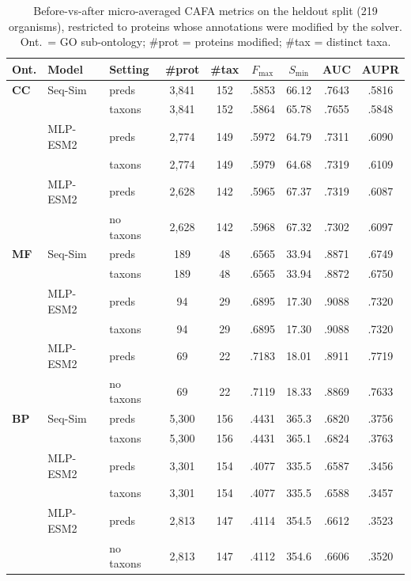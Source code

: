 \begin{table}[!h]
\centering
\caption{Before-vs-after micro-averaged CAFA metrics on the heldout split (219 organisms), restricted to proteins whose annotations were modified by the solver. Ont.\ = GO sub-ontology; \#prot = proteins modified; \#tax = distinct taxa.}
\label{tab:supp-modified}
\small
\setlength{\tabcolsep}{3pt}
\renewcommand{\arraystretch}{0.92}
\begin{tabular}{lll*{6}c}
\toprule
Ont. & Model & Setting & \#prot & \#tax & $F_{\max}$ & $S_{\min}$ & AUC & AUPR \\
\midrule
\textbf{CC} & Seq-Sim   & preds      & 3{,}841 & 152 & .5853 & 66.12 & .7643 & .5816 \\
            &           & taxons     & 3{,}841 & 152 & .5864 & 65.78 & .7655 & .5848 \\
            & MLP-ESM2  & preds      & 2{,}774 & 149 & .5972 & 64.79 & .7311 & .6090 \\
            &           & taxons     & 2{,}774 & 149 & .5979 & 64.68 & .7319 & .6109 \\
            & MLP-ESM2  & preds      & 2{,}628 & 142 & .5965 & 67.37 & .7319 & .6087 \\
            &           & no taxons  & 2{,}628 & 142 & .5968 & 67.32 & .7302 & .6097 \\
\addlinespace[2pt]
\textbf{MF} & Seq-Sim   & preds      &    189 &  48 & .6565 & 33.94 & .8871 & .6749 \\
            &           & taxons     &    189 &  48 & .6565 & 33.94 & .8872 & .6750 \\
            & MLP-ESM2  & preds      &     94 &  29 & .6895 & 17.30 & .9088 & .7320 \\
            &           & taxons     &     94 &  29 & .6895 & 17.30 & .9088 & .7320 \\
            & MLP-ESM2  & preds      &     69 &  22 & .7183 & 18.01 & .8911 & .7719 \\
            &           & no taxons  &     69 &  22 & .7119 & 18.33 & .8869 & .7633 \\
\addlinespace[2pt]
\textbf{BP} & Seq-Sim   & preds      & 5{,}300 & 156 & .4431 & 365.3 & .6820 & .3756 \\
            &           & taxons     & 5{,}300 & 156 & .4431 & 365.1 & .6824 & .3763 \\
            & MLP-ESM2  & preds      & 3{,}301 & 154 & .4077 & 335.5 & .6587 & .3456 \\
            &           & taxons     & 3{,}301 & 154 & .4077 & 335.5 & .6588 & .3457 \\
            & MLP-ESM2  & preds      & 2{,}813 & 147 & .4114 & 354.5 & .6612 & .3523 \\
            &           & no taxons  & 2{,}813 & 147 & .4112 & 354.6 & .6606 & .3520 \\
\bottomrule
\end{tabular}
\end{table}
